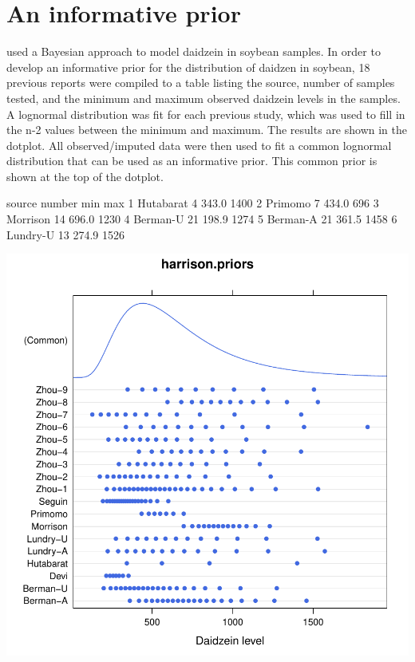 \documentclass[12pt]{article}\usepackage[]{graphicx}\usepackage[]{color}
\makeatletter
\def\maxwidth{ %
  \ifdim\Gin@nat@width>\linewidth
    \linewidth
  \else
    \Gin@nat@width
  \fi
}
\newenvironment{kframe}{%
 \def\at@end@of@kframe{}%
 \ifinner\ifhmode%
  \def\at@end@of@kframe{\end{minipage}}%
  \begin{minipage}{\columnwidth}%
 \fi\fi%
 \def\FrameCommand##1{\hskip\@totalleftmargin \hskip-\fboxsep
 \colorbox{shadecolor}{##1}\hskip-\fboxsep
     \hskip-\linewidth \hskip-\@totalleftmargin \hskip\columnwidth}%
 \MakeFramed {\advance\hsize-\width
   \@totalleftmargin\z@ \linewidth\hsize
   \@setminipage}}%
 {\par\unskip\endMakeFramed%
 \at@end@of@kframe}
\newenvironment{knitrout}{}{} %
\makeatother
\begin{document}
\begin{knitrout}
{}



\end{knitrout}


\pagebreak
\section{An informative prior}

\cite{harrison2012bayesian} used a Bayesian approach to model daidzein in soybean
samples.  In order to develop an informative prior for the distribution of
daidzen in soybean, 18 previous reports were compiled to a table listing the
source, number of samples tested, and the minimum and maximum observed
daidzein levels in the samples.  A lognormal distribution was fit for each
previous study, which was used to fill in the n-2 values between the minimum
and maximum.  The results are shown in the dotplot.  All observed/imputed data
were then used to fit a common lognormal distribution that can be used as an
informative prior.  This common prior is shown at the top of the dotplot.

\begin{knitrout}
\color{fgcolor}\begin{kframe}
\begin{Soutput}
     source number   min  max
1 Hutabarat      4 343.0 1400
2   Primomo      7 434.0  696
3  Morrison     14 696.0 1230
4  Berman-U     21 198.9 1274
5  Berman-A     21 361.5 1458
6  Lundry-U     13 274.9 1526
\end{Soutput}
\end{kframe}

{\centering \includegraphics[width=\maxwidth]{figs/ag2-harrison} 

}



\end{knitrout}
\end{document}
